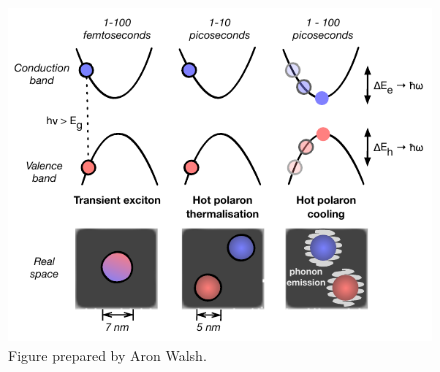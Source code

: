 \begin{figure}[h!]
\centering
  \includegraphics[width=0.7\columnwidth]{figures/ch5/f1.pdf}
  \caption[Hot carrier cooling model]{Figure prepared by Aron Walsh.}
\label{cooling_schematic}
\end{figure}

